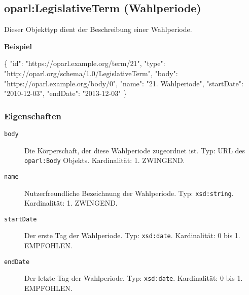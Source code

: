 \documentclass[,a4paper]{article}
\newenvironment{Shaded}{}{}
\newcommand{\DataTypeTok}[1]{\textcolor[rgb]{0.56,0.13,0.00}{{#1}}}
\newcommand{\StringTok}[1]{\textcolor[rgb]{0.25,0.44,0.63}{{#1}}}
\newcommand{\FunctionTok}[1]{\textcolor[rgb]{0.02,0.16,0.49}{{#1}}}
\begin{document}
\subsection{oparl:LegislativeTerm
(Wahlperiode)}\label{oparlux5flegislativeux5fterm}

Dieser Objekttyp dient der Beschreibung einer Wahlperiode.

\textbf{Beispiel}

\begin{Shaded}
\begin{Highlighting}[]
\FunctionTok{\{}
    \DataTypeTok{"id"}\FunctionTok{:} \StringTok{"https://oparl.example.org/term/21"}\FunctionTok{,}
    \DataTypeTok{"type"}\FunctionTok{:} \StringTok{"http://oparl.org/schema/1.0/LegislativeTerm"}\FunctionTok{,}
    \DataTypeTok{"body"}\FunctionTok{:} \StringTok{"https://oparl.example.org/body/0"}\FunctionTok{,}
    \DataTypeTok{"name"}\FunctionTok{:} \StringTok{"21. Wahlperiode"}\FunctionTok{,}
    \DataTypeTok{"startDate"}\FunctionTok{:} \StringTok{"2010-12-03"}\FunctionTok{,}
    \DataTypeTok{"endDate"}\FunctionTok{:}  \StringTok{"2013-12-03"}
\FunctionTok{\}}
\end{Highlighting}
\end{Shaded}

\subsubsection{Eigenschaften}\label{eigenschaften-11}

\begin{description}
\item[\texttt{body}]
Die Körperschaft, der diese Wahlperiode zugeordnet ist. Typ: URL des
\texttt{oparl:Body} Objekts. Kardinalität: 1. ZWINGEND.
\item[\texttt{name}]
Nutzerfreundliche Bezeichnung der Wahlperiode. Typ: \texttt{xsd:string}.
Kardinalität: 1. ZWINGEND.
\item[\texttt{startDate}]
Der erste Tag der Wahlperiode. Typ: \texttt{xsd:date}. Kardinalität: 0
bis 1. EMPFOHLEN.
\item[\texttt{endDate}]
Der letzte Tag der Wahlperiode. Typ: \texttt{xsd:date}. Kardinalität: 0
bis 1. EMPFOHLEN.
\end{description}
\end{document}
